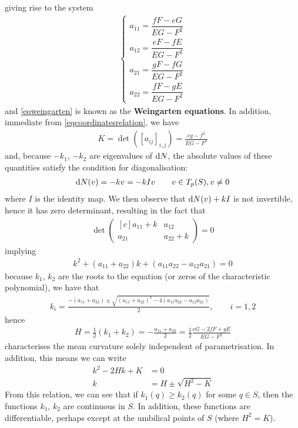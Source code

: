 \documentclass{amsart} %
\theoremstyle{mytheoremstyle}
\theoremstyle{definition}
\numberwithin{equation}{section}
\DeclareMathOperator{\1}{\mathbbm{1}}
\DeclareMathOperator{\D}{\dif}
\renewcommand{\geq}{\geqslant}
\renewcommand{\geq}{\geqslant}
\begin{document}
giving rise to the system
\begin{align}
\label{eqweingarten}
\begin{cases*}
a_{11} = \dfrac{fF - eG}{EG - F^2} \\
a_{12} = \dfrac{eF - fE}{EG - F^2} \\
a_{21} = \dfrac{gF - fG}{EG - F^2} \\
a_{22} = \dfrac{fF - gE}{EG - F^2}
\end{cases*}
\end{align}
and \eqref{eqweingarten} is known as the \textbf{Weingarten equations}. In addition, immediate from \eqref{eqcoordinatesrelation}, we have
\begin{align}
\label{eqmeancurvaturecharacterisation}
K = \det ( [a_{ij}]_{i,j} ) = \frac{eg- f^2}{EG - F^2}
\end{align}
and, because $-k_1$, $-k_2$ are eigenvalues of $\D N$, the absolute values of these quantities satisfy the condition for diagonalisation:
\begin{align*}
	\D N(v) = -kv = -kIv \qquad v \in T_p (S), v \neq 0
\end{align*}
where $I $ is the identity map. We then observe that $\D N(v) + kI $ is not invertible, hence it has zero determinant, resulting in the fact that
\begin{align*}
	\det \begin{pmatrix*}[c]
	a_{11} + k & a_{12} \\ a_{21} & a_{22} + k
	\end{pmatrix*} = 0
\end{align*}
implying
\begin{align*}
	k^2 + (a_{11} + a_{22}) k + (a_{11} a_{22} - a_{12} a_{21}) = 0 
\end{align*}
because $k_1$, $k_2$ are the roots to the equation (or zeros of the characteristic polynomial), we have that
\begin{align*}
	k_{i} = \frac{ -(a_{11} + a_{22}) \pm \sqrt{(a_{11} + a_{22})^2 - 4 (a_{11} a_{22} - a_{12} a_{21}) } }{2}, \qquad i = 1,2
\end{align*}
hence
\begin{align}
	H = \frac{1}{2} (k_1 + k_2) = - \frac{a_{11} + a_{22}}{2} = \frac{1}{2} \frac{eG - 2fF + gE}{EG - F^2}
\end{align}
characterises the mean curvature solely independent of parametrisation. In addition, this means we can write
\begin{align}
\nonumber k^2 - 2Hk + K &= 0 \\
\label{eqeigenvaluesofdN} k &= H \pm \sqrt{H^2 - K}
\end{align}
From this relation, we can see that if $k_1 (q) \geq k_2(q)$ for some $q \in S$, then the functions $k_1$, $k_2$ are continuous in $S$. In addition, these functions are differentiable, perhaps except at the umbilical points of $S$ (where $H^2 = K$).
\end{document}
